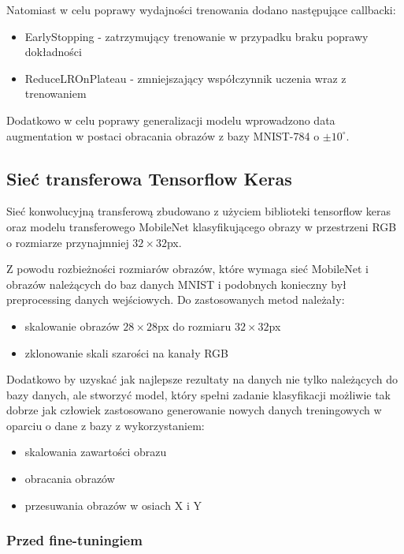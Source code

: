 \documentclass{article}
\begin{document}
Natomiast w celu poprawy wydajności trenowania dodano następujące callbacki:

\begin{itemize}
    \item EarlyStopping - zatrzymujący trenowanie w przypadku braku poprawy dokładności
    \item ReduceLROnPlateau - zmniejszający współczynnik uczenia wraz z trenowaniem
\end{itemize}

Dodatkowo w celu poprawy generalizacji modelu wprowadzono data augmentation w 
postaci obracania obrazów z bazy MNIST-784 o $\pm10^\circ$.

\subsection{Sieć transferowa Tensorflow Keras}

Sieć konwolucyjną transferową zbudowano z użyciem biblioteki tensorflow 
keras oraz modelu transferowego MobileNet klasyfikującego obrazy w 
przestrzeni RGB o rozmiarze przynajmniej $32\times32$px.

Z powodu rozbieżności rozmiarów obrazów, które wymaga sieć MobileNet 
i obrazów należących do baz danych MNIST i podobnych konieczny był 
preprocessing danych wejściowych. Do zastosowanych metod należały:

\begin{itemize}
\item skalowanie obrazów $28\times28$px do rozmiaru $32\times32$px
\item zklonowanie skali szarości na kanały RGB 
\end{itemize}

Dodatkowo by uzyskać jak najlepsze rezultaty na danych nie tylko 
należących do bazy danych, ale stworzyć model, który spełni zadanie 
klasyfikacji możliwie tak dobrze jak człowiek zastosowano 
generowanie nowych danych treningowych w oparciu o dane z bazy z wykorzystaniem:

\begin{itemize}
\item skalowania zawartości obrazu
\item obracania obrazów
\item przesuwania obrazów w osiach X i Y
\end{itemize}

\subsubsection{Przed fine-tuningiem}
\end{document}
